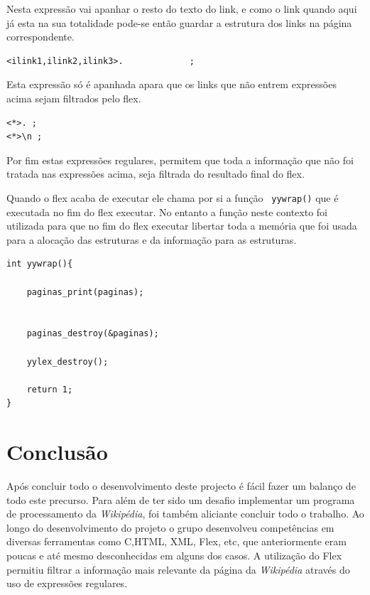 \documentclass[11pt, a4paper, oneside]{article}
\begin{document}
Nesta expressão vai apanhar o resto do texto do link, e como o link quando aqui já esta na sua totalidade pode-se então guardar a estrutura dos links na página correspondente.


\begin{verbatim}
<ilink1,ilink2,ilink3>.             ;
\end{verbatim}


Esta expressão só é apanhada apara que os links que não entrem expressões acima sejam filtrados pelo flex. 





\begin{verbatim}
<*>. ;
<*>\n ;
\end{verbatim}

Por fim estas expressões regulares, permitem que toda a informação que não foi tratada nas expressões acima, seja filtrada do resultado final do flex.

Quando o flex acaba de executar ele chama por si a função \texttt{ yywrap()} que é executada no fim do flex executar.
No entanto a função neste contexto foi utilizada para que no fim do flex executar libertar toda a memória que foi usada para a alocação das estruturas e da informação para as estruturas.

\begin{verbatim}
int yywrap(){

    paginas_print(paginas);

 
    paginas_destroy(&paginas);
    
    yylex_destroy();

    return 1;
}
\end{verbatim}



\newpage
\section{Conclusão}

Após concluir todo o desenvolvimento deste projecto é fácil fazer um balanço de todo este precurso. Para além de ter sido um desafio implementar um programa de processamento da \textit{Wikipédia}, foi também aliciante concluir todo o trabalho.
Ao longo do desenvolvimento do projeto o grupo desenvolveu competências em diversas ferramentas como C,HTML, XML, Flex, etc, que anteriormente eram poucas e até mesmo desconhecidas em alguns dos casos. 
A utilização do Flex permitiu filtrar a informação mais relevante da página da \textit{Wikipédia} através do uso de expressões regulares. 
\newpage
\end{document}
